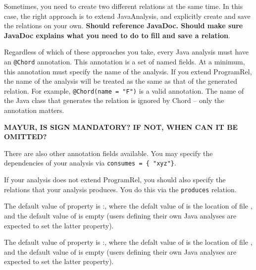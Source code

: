 Sometimes, you need to create two different relations at the same time. In this case, the right approach is to
extend JavaAnalysis, and explicitly create and save the relations on your own.
\textbf{Should reference JavaDoc.  Should make sure JavaDoc explains what you need to do to fill and save a relation}.

Regardless of which of these approaches you take, every Java analysis must have an \texttt{@Chord} annotation.
This annotation is a set of named fields.
At a minimum, this annotation must specify the name of the analysis.
If you extend ProgramRel, the name of the analysis will be treated as the same as that of the generated relation.
For example, \texttt{@Chord(name = "F")} is a valid annotation. 
The name of the Java class that generates the relation is ignored by Chord -- only the annotation matters.

\textbf{MAYUR, IS SIGN MANDATORY?   IF NOT, WHEN CAN IT BE OMITTED?}

There are also other annotation fields available.
You may specify the dependencies of your analysis via \texttt{consumes = \{ "xyz"\}}.

If your analysis does not extend ProgramRel, you should also specify the relations that your 
analysis produces. You do this via the \texttt{produces} relation.

%
%

The default value of property 
is :,
where the defalt value of  is the location of file , and
the default value of  is empty (users defining their own Java analyses are expected to
set the latter property).

The default value of property 
is :,
where the defalt value of  is the location of file , and
the default value of  is empty (users defining their own Java analyses are expected to
set the latter property).

